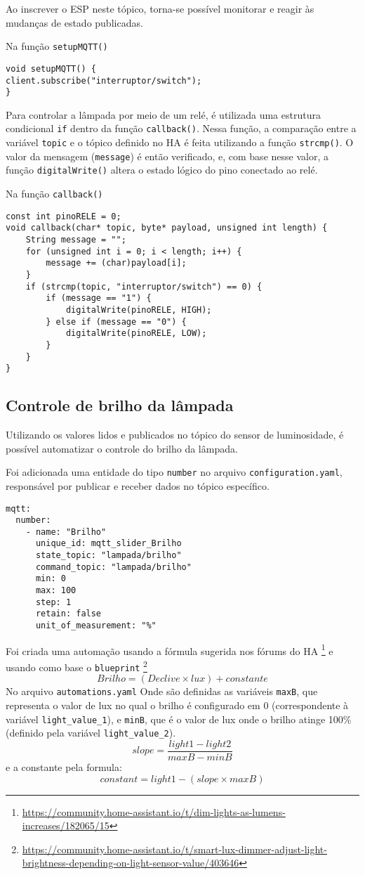 \documentclass[]{abntex2}
\begin{document}
Ao inscrever o ESP neste tópico, torna-se possível monitorar e reagir às
mudanças de estado publicadas.

Na função \texttt{setupMQTT()}

\begin{verbatim}
void setupMQTT() {
client.subscribe("interruptor/switch");
}
\end{verbatim}

Para controlar a lâmpada por meio de um relé, é utilizada uma estrutura
condicional \texttt{if} dentro da função \texttt{callback()}.
Nessa função, a comparação entre a variável \texttt{topic} e o tópico definido
no HA é feita utilizando a função \texttt{strcmp()}.
O valor da mensagem (\texttt{message}) é então verificado, e, com base nesse
valor, a função \texttt{digitalWrite()} altera o estado lógico do pino
conectado ao relé.

Na função \texttt{callback()}
\begin{verbatim}
const int pinoRELE = 0;
void callback(char* topic, byte* payload, unsigned int length) {
	String message = "";
	for (unsigned int i = 0; i < length; i++) {
		message += (char)payload[i];
	}
	if (strcmp(topic, "interruptor/switch") == 0) {
		if (message == "1") {
			digitalWrite(pinoRELE, HIGH);
		} else if (message == "0") {
			digitalWrite(pinoRELE, LOW);
		}
	}
}
\end{verbatim}
\subsection{Controle de brilho da lâmpada}
Utilizando os valores lidos e publicados no tópico do sensor de luminosidade, é
possível automatizar o controle do brilho da lâmpada.

Foi adicionada uma entidade do tipo \texttt{number} no arquivo
\texttt{configuration.yaml}, responsável por publicar e receber dados no tópico
específico.
\begin{verbatim}
mqtt:
  number:
    - name: "Brilho"
      unique_id: mqtt_slider_Brilho
      state_topic: "lampada/brilho"
      command_topic: "lampada/brilho"
      min: 0
      max: 100
      step: 1
      retain: false
      unit_of_measurement: "%"
\end{verbatim}
Foi criada uma automação usando a fórmula sugerida nos fórums do HA
\footnote{\url{https://community.home-assistant.io/t/dim-lights-as-lumens-increases/182065/15}}
e usando como base o \texttt{blueprint} \footnote{\url{https://community.home-assistant.io/t/smart-lux-dimmer-adjust-light-brightness-depending-on-light-sensor-value/403646}}
\[
	Brilho = (Declive \times  lux) + constante
\]
No arquivo \texttt{automations.yaml} Onde são definidas as variáveis
\texttt{maxB}, que representa o valor de lux no qual o brilho é configurado em
0 (correspondente à variável \texttt{light\_value\_1}), e \texttt{minB}, que é o
valor de lux onde o brilho atinge 100\% (definido pela variável
\texttt{light\_value\_2}).\[
slope= \frac{light1 - light2}{maxB - minB}
\]
e a constante pela formula:
\[
constant = light1 - (slope \times maxB)
\]
\end{document}
